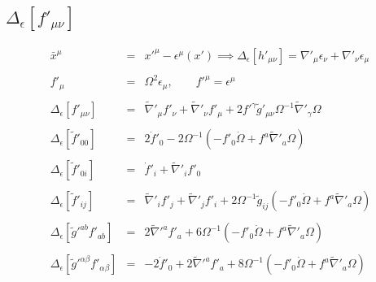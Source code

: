\documentclass[10pt,letterpaper]{article}
\numberwithin{equation}{section}
\begin{document}
\subsection{$\Delta_{\epsilon}[f'_{\mu\nu}]$}
\begin{eqnarray}
\bar x^\mu &=&  x'^\mu - \epsilon^\mu(x') \implies \Delta_\epsilon \left[ h'_{\mu\nu}\right] = \nabla'_\mu \epsilon_\nu +\nabla'_\nu \epsilon_\mu
\label{gaugetrans2}
\\ \nonumber\\
f'_{\mu} &=& \Omega^2 \epsilon_\mu,\qquad f'^\mu = \epsilon^\mu
\\ \nonumber\\
\Delta_\epsilon\left[ f'_{\mu\nu} \right]  &=& \tilde\nabla'_{\mu }f'_{\nu} + \tilde\nabla'_{\nu}f'_{\mu} + 2 f'^{\gamma } \tilde g'_{\mu\nu} \Omega^{-1} \tilde\nabla'_{\gamma }\Omega
\\ \nonumber\\
\Delta_\epsilon\left[ \tilde f'_{00} \right] &=&  2\dot f'_0 - 2\Omega^{-1} \left( -f'_0 \dot \Omega + f^a\tilde\nabla'_a \Omega\right) 
\\ \nonumber\\
\Delta_\epsilon\left[ \tilde f'_{0i} \right]  &=&  \dot f'_i + \tilde\nabla'_i f'_0
\\ \nonumber\\
\Delta_\epsilon\left[ \tilde f'_{ij}  \right]  &=& \tilde\nabla'_{i }f'_{j } + \tilde\nabla'_{j}f'_{i} + 2\Omega^{-1} \tilde g_{ij} \left( -f'_0 \dot \Omega + f^a\tilde\nabla'_a \Omega\right) 
\\ \nonumber\\
\Delta_\epsilon\left[ \tilde g'^{ab} f'_{ab} \right]  &=& 2\tilde\nabla'^a f'_a + 6\Omega^{-1} \left( -f'_0 \dot \Omega + f^a\tilde\nabla'_a \Omega\right) 
\\ \nonumber\\
\Delta_\epsilon\left[ \tilde g'^{\alpha\beta} f'_{\alpha\beta} \right]  &=& -2\dot f'_0+ 2\tilde\nabla'^a f'_a + 8\Omega^{-1} \left( -f'_0 \dot \Omega + f^a\tilde\nabla'_a \Omega\right)
\end{eqnarray}
\end{document}
